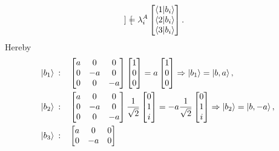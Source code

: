 \begin{example}
\begin{enumerate}
\begin{equation}
\begin{bmatrix}
			\end{bmatrix}=
			\lambda^A_i\begin{bmatrix}
				\braket{1|b_i}\\
				\braket{2|b_i}\\
				\braket{3|b_i}\\
			\end{bmatrix}.
		\end{equation} 
		Hereby
		\begin{equation}
			\begin{split}
				&\ket{b_1}\text{ :}\quad 
				\begin{bmatrix}
					a & 0 & 0 \\
					0 & -a & 0\\
					0 & 0 & -a \\
				\end{bmatrix}
				\begin{bmatrix}
					1\\
					0\\
					0\\
				\end{bmatrix}=
				a\begin{bmatrix}
					1\\
					0\\
					0\\
				\end{bmatrix}\Rightarrow\ket{b_1}=\ket{b,a},\\
				&\ket{b_2}\text{ :}\quad 
				\begin{bmatrix}
					a & 0 & 0 \\
					0 & -a & 0\\
					0 & 0 & -a \\
				\end{bmatrix}\frac{1}{\sqrt{2}}
				\begin{bmatrix}
					0\\
					1\\
					i\\
				\end{bmatrix}=
				-a\frac{1}{\sqrt{2}}
				\begin{bmatrix}
					0\\
					1\\
					i\\
				\end{bmatrix}\Rightarrow\ket{b_2}=\ket{b,-a},\\
				&\ket{b_3}\text{ :}\quad 
				\begin{bmatrix}
					a & 0 & 0 \\
					0 & -a & 0\\

\end{bmatrix}
\end{split}
\end{equation}
\end{enumerate}
\end{example}
